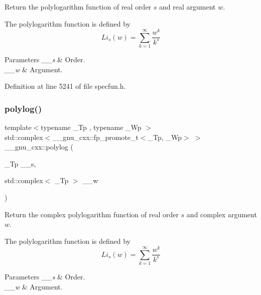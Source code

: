 Return the polylogarithm function of real order $ s $ and real argument $ w $.

The polylogarithm function is defined by \[ Li_s(w) = \sum_{k=1}^{\infty} \frac{w^k}{k^s} \]


\begin{DoxyParams}{Parameters}
{\em \+\_\+\+\_\+s} & Order. \\
\hline
{\em \+\_\+\+\_\+w} & Argument. \\
\hline
\end{DoxyParams}


Definition at line 5241 of file specfun.\+h.

\mbox{\label{group__gnu__math__spec__func_ga817a208972a0200b667c68d199176d70}} 
\subsubsection{\texorpdfstring{polylog()}{polylog()}\hspace{0.1cm}{\footnotesize\ttfamily [2/2]}}
{\footnotesize\ttfamily template$<$typename \+\_\+\+Tp , typename \+\_\+\+Wp $>$ \\
std\+::complex$<$\+\_\+\+\_\+gnu\+\_\+cxx\+::fp\+\_\+promote\+\_\+t$<$\+\_\+\+Tp, \+\_\+\+Wp$>$ $>$ \+\_\+\+\_\+gnu\+\_\+cxx\+::polylog (\begin{DoxyParamCaption}\item[{\+\_\+\+Tp}]{\+\_\+\+\_\+s,  }\item[{std\+::complex$<$ \+\_\+\+Tp $>$}]{\+\_\+\+\_\+w }\end{DoxyParamCaption})\hspace{0.3cm}{\ttfamily [inline]}}

Return the complex polylogarithm function of real order $ s $ and complex argument $ w $.

The polylogarithm function is defined by \[ Li_s(w) = \sum_{k=1}^{\infty} \frac{w^k}{k^s} \]


\begin{DoxyParams}{Parameters}
{\em \+\_\+\+\_\+s} & Order. \\
\hline
{\em \+\_\+\+\_\+w} & Argument. \\
\hline
\end{DoxyParams}


